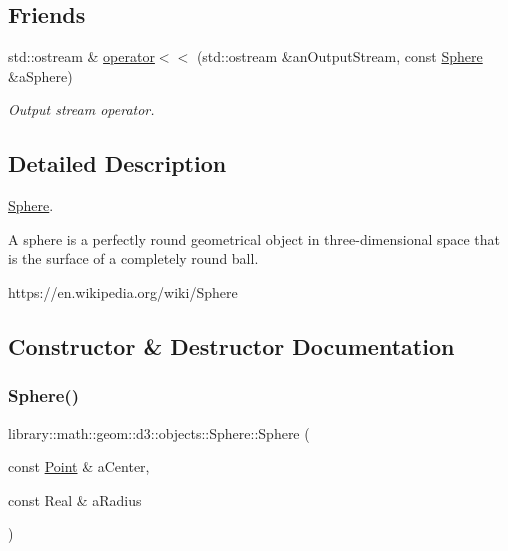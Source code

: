 \subsection*{Friends}
\begin{DoxyCompactItemize}
\item 
std\+::ostream \& \hyperlink{classlibrary_1_1math_1_1geom_1_1d3_1_1objects_1_1_sphere_abb141c02e081d1acce5f0d840276a5dd}{operator$<$$<$} (std\+::ostream \&an\+Output\+Stream, const \hyperlink{classlibrary_1_1math_1_1geom_1_1d3_1_1objects_1_1_sphere}{Sphere} \&a\+Sphere)
\begin{DoxyCompactList}\small\item\em Output stream operator. \end{DoxyCompactList}\end{DoxyCompactItemize}


\subsection{Detailed Description}
\hyperlink{classlibrary_1_1math_1_1geom_1_1d3_1_1objects_1_1_sphere}{Sphere}. 

A sphere is a perfectly round geometrical object in three-\/dimensional space that is the surface of a completely round ball.

https\+://en.wikipedia.\+org/wiki/\+Sphere 

\subsection{Constructor \& Destructor Documentation}
\mbox{\label{classlibrary_1_1math_1_1geom_1_1d3_1_1objects_1_1_sphere_a55dccc8ea16ee55cd7694c26afa8ea39}} 
\subsubsection{\texorpdfstring{Sphere()}{Sphere()}}
{\footnotesize\ttfamily library\+::math\+::geom\+::d3\+::objects\+::\+Sphere\+::\+Sphere (\begin{DoxyParamCaption}\item[{const \hyperlink{classlibrary_1_1math_1_1geom_1_1d3_1_1objects_1_1_point}{Point} \&}]{a\+Center,  }\item[{const Real \&}]{a\+Radius }\end{DoxyParamCaption})}




